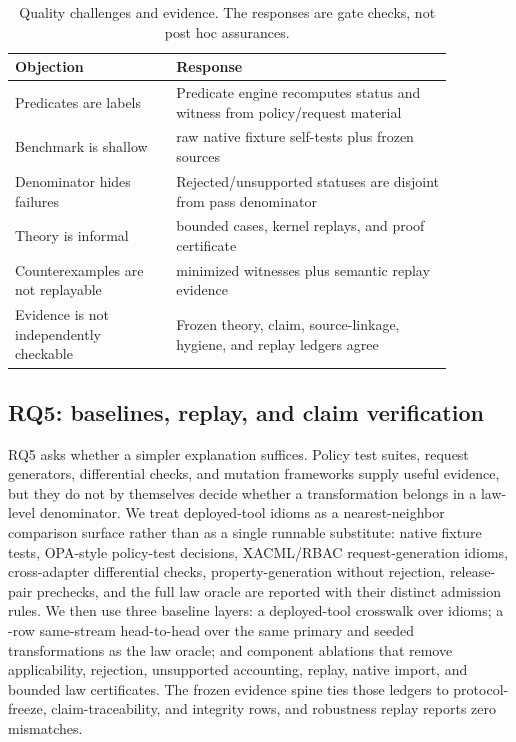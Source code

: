 \documentclass[10pt,conference]{IEEEtran}
\begin{document}
\begin{table}[t]
\centering
\caption{Quality challenges and evidence.  The responses are gate checks, not post hoc assurances.}
\label{tab:objections}
\begin{tabular}{p{0.32\linewidth}p{0.55\linewidth}}
\toprule
Objection & Response \\
\midrule
Predicates are labels & Predicate engine recomputes status and witness from policy/request material \\
Benchmark is shallow & \LGNativeSelftests{} raw native fixture self-tests plus \LGSources{} frozen sources \\
Denominator hides failures & Rejected/unsupported statuses are disjoint from pass denominator \\
Theory is informal & \LGModelCheckCases{} bounded cases, \LGMechanizedKernelCases{} kernel replays, and proof certificate \\
Counterexamples are not replayable & \LGCounterexamples{} minimized witnesses plus semantic replay evidence \\
Evidence is not independently checkable & Frozen theory, claim, source-linkage, hygiene, and replay ledgers agree \\
\bottomrule
\end{tabular}
\end{table}

\subsection{RQ5: baselines, replay, and claim verification}
RQ5 asks whether a simpler explanation suffices.  Policy test suites, request generators, differential checks, and mutation frameworks supply useful evidence, but they do not by themselves decide whether a transformation belongs in a law-level denominator.  We treat deployed-tool idioms as a nearest-neighbor comparison surface rather than as a single runnable substitute: native fixture tests, OPA-style policy-test decisions, XACML/RBAC request-generation idioms, cross-adapter differential checks, property-generation without rejection, release-pair prechecks, and the full law oracle are reported with their distinct admission rules.  We then use three baseline layers: a deployed-tool crosswalk over \LGDeployedCrosswalkRows{} idioms; a \LGDeployedHeadToHeadRows{}-row same-stream head-to-head over the same primary and seeded transformations as the law oracle; and component ablations that remove applicability, rejection, unsupported accounting, replay, native import, and bounded law certificates.  The frozen evidence spine ties those ledgers to protocol-freeze, claim-traceability, and integrity rows, and robustness replay reports zero mismatches.
\end{document}
